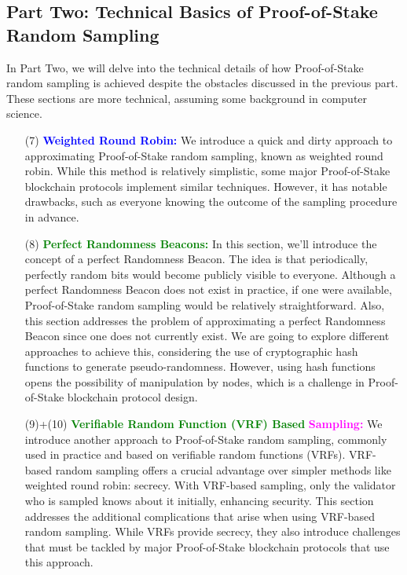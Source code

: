 \subsection{Part Two: Technical Basics of Proof-of-Stake Random Sampling}

In Part Two, we will delve into the technical details of how Proof-of-Stake random sampling is achieved despite the obstacles discussed in the previous part. These sections are more technical, assuming some background in computer science.

\begin{enumerate}[label=(\arabic*)]
  \item[(7)] \textcolor{blue}{\textbf{Weighted Round Robin:}} We introduce a quick and dirty approach to approximating Proof-of-Stake random sampling, known as weighted round robin. While this method is relatively simplistic, some major Proof-of-Stake blockchain protocols implement similar techniques. However, it has notable drawbacks, such as everyone knowing the outcome of the sampling procedure in advance.

  \item[(8)] \textcolor{green}{\textbf{Perfect Randomness Beacons:}} In this section, we'll introduce the concept of a perfect Randomness Beacon. The idea is that periodically, perfectly random bits would become publicly visible to everyone. Although a perfect Randomness Beacon does not exist in practice, if one were available, Proof-of-Stake random sampling would be relatively straightforward. Also, this section addresses the problem of approximating a perfect Randomness Beacon since one does not currently exist. We are going to explore different approaches to achieve this, considering the use of cryptographic hash functions to generate pseudo-randomness. However, using hash functions opens the possibility of manipulation by nodes, which is a challenge in Proof-of-Stake blockchain protocol design.

  \item[(9)+(10)] \textcolor{green}{\textbf{Verifiable Random Function (VRF) Based}} \textcolor{magenta}{\textbf{Sampling:}} We introduce another approach to Proof-of-Stake random sampling, commonly used in practice and based on verifiable random functions (VRFs). VRF-based random sampling offers a crucial advantage over simpler methods like weighted round robin: secrecy. With VRF-based sampling, only the validator who is sampled knows about it initially, enhancing security. This section addresses the additional complications that arise when using VRF-based random sampling. While VRFs provide secrecy, they also introduce challenges that must be tackled by major Proof-of-Stake blockchain protocols that use this approach.


\end{enumerate}

